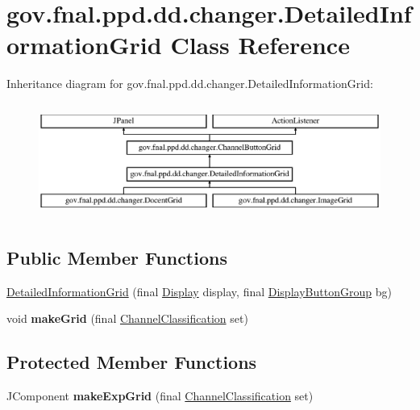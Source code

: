 \hypertarget{classgov_1_1fnal_1_1ppd_1_1dd_1_1changer_1_1DetailedInformationGrid}{\section{gov.\-fnal.\-ppd.\-dd.\-changer.\-Detailed\-Information\-Grid Class Reference}
\label{classgov_1_1fnal_1_1ppd_1_1dd_1_1changer_1_1DetailedInformationGrid}
}
Inheritance diagram for gov.\-fnal.\-ppd.\-dd.\-changer.\-Detailed\-Information\-Grid\-:\begin{figure}[H]
\begin{center}
\leavevmode
\includegraphics[height=3.783784cm]{classgov_1_1fnal_1_1ppd_1_1dd_1_1changer_1_1DetailedInformationGrid}
\end{center}
\end{figure}
\subsection*{Public Member Functions}
\begin{DoxyCompactItemize}
\item 
\hyperlink{classgov_1_1fnal_1_1ppd_1_1dd_1_1changer_1_1DetailedInformationGrid_ab24503e5e35e12bd5b9a597ce745b693}{Detailed\-Information\-Grid} (final \hyperlink{interfacegov_1_1fnal_1_1ppd_1_1dd_1_1signage_1_1Display}{Display} display, final \hyperlink{classgov_1_1fnal_1_1ppd_1_1dd_1_1util_1_1DisplayButtonGroup}{Display\-Button\-Group} bg)
\item 
\hypertarget{classgov_1_1fnal_1_1ppd_1_1dd_1_1changer_1_1DetailedInformationGrid_a5bd425b13017a5bb4ca36f663d2f966f}{void {\bfseries make\-Grid} (final \hyperlink{classgov_1_1fnal_1_1ppd_1_1dd_1_1changer_1_1ChannelClassification}{Channel\-Classification} set)}\label{classgov_1_1fnal_1_1ppd_1_1dd_1_1changer_1_1DetailedInformationGrid_a5bd425b13017a5bb4ca36f663d2f966f}

\end{DoxyCompactItemize}
\subsection*{Protected Member Functions}
\begin{DoxyCompactItemize}
\item 
\hypertarget{classgov_1_1fnal_1_1ppd_1_1dd_1_1changer_1_1DetailedInformationGrid_ab76f38e7452fe7c82d24cfba6f95b7aa}{J\-Component {\bfseries make\-Exp\-Grid} (final \hyperlink{classgov_1_1fnal_1_1ppd_1_1dd_1_1changer_1_1ChannelClassification}{Channel\-Classification} set)}\label{classgov_1_1fnal_1_1ppd_1_1dd_1_1changer_1_1DetailedInformationGrid_ab76f38e7452fe7c82d24cfba6f95b7aa}

\end{DoxyCompactItemize}
